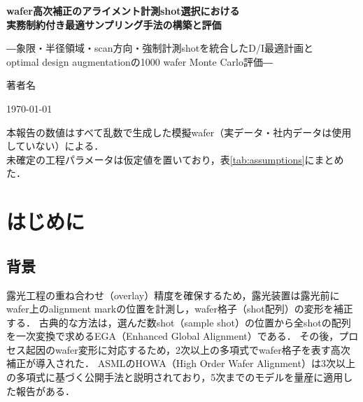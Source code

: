 \documentclass[10.5pt,a4paper]{ltjsarticle}
\begin{document}
\begin{titlepage}
  \centering
  \vspace*{35mm}
  {\LARGE\bfseries wafer高次補正のアライメント計測shot選択における\\[3mm]実務制約付き最適サンプリング手法の構築と評価\par}
  \vspace{8mm}
  {\large ―象限・半径領域・scan方向・強制計測shotを統合したD/I最適計画と\\[1mm]optimal design augmentationの1000 wafer Monte Carlo評価―\par}
  \vspace{40mm}
  {\Large 著者名\par}  %
  \vspace{8mm}
  {\large \today\par}
  \vfill
  {\small 本報告の数値はすべて乱数で生成した模擬wafer（実データ・社内データは使用していない）による．\\
   未確定の工程パラメータは仮定値を置いており，表\ref{tab:assumptions}にまとめた．\par}
\end{titlepage}

\tableofcontents
\newpage

\section{はじめに}

\subsection{背景}

露光工程の重ね合わせ（overlay）精度を確保するため，露光装置は露光前にwafer上のalignment markの位置を計測し，wafer格子（shot配列）の変形を補正する．
古典的な方法は，選んだ数shot（sample shot）の位置から全shotの配列を一次変換で求めるEGA（Enhanced Global Alignment）である\cite{slonaker1988}．
その後，プロセス起因のwafer変形に対応するため，2次以上の多項式でwafer格子を表す高次補正が導入された\cite{adel2007}．
ASMLのHOWA（High Order Wafer Alignment）は3次以上の多項式に基づく公開手法と説明されており\cite{us9291916}，5次までのモデルを量産に適用した報告がある\cite{wang2009,pike2012,jeon2013}．
\end{document}
